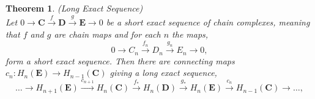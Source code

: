 \documentclass[11.5pt, twoside, a4paper, titlepage]{report}
\theoremstyle{definition}
\theoremstyle{plain}
\newtheorem{thm}[mydef]{Theorem}
\begin{document}
\begin{thm} (Long Exact Sequence) \label{longexactseqthm} \\
Let $0\xrightarrow{}\mathbf{C} \xrightarrow{f} \mathbf{D} \xrightarrow{g} \mathbf{E} \xrightarrow{}0$ be a short exact sequence of chain complexes, meaning that $f$ and $g$ are chain maps and for each $n$ the maps,
\begin{equation*}
0 \xrightarrow{} C_n \xrightarrow{f_n} D_n \xrightarrow{g_n} E_n \xrightarrow{} 0,
\end{equation*}
form a short exact sequence. Then there are connecting maps $c_n:H_n(\mathbf{E}) \to H_{n-1}(\mathbf{C})$ giving a long exact sequence, 
\begin{equation*}
\dots \xrightarrow{}H_{n+1}(\mathbf{E}) \xrightarrow{c_{n+1}} H_n(\mathbf{C}) \xrightarrow{f_{\ast}} H_n(\mathbf{D})\xrightarrow{g_{\ast}}H_n(\mathbf{E}) \xrightarrow{c_n} H_{n-1}(\mathbf{C}) \xrightarrow{} \dots,
\end{equation*}
\end{thm}
\end{document}
